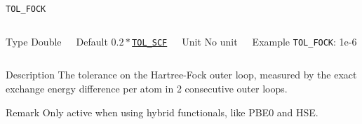 \documentclass[xcolor=dvipsnames,t]{beamer}
\begin{document}
\begin{frame}[allowframebreaks]{\texttt{TOL\_FOCK}} \label{TOL_FOCK}
\vspace*{-12pt}
\begin{columns}
\begin{block}{Type}
Double
\end{block}

\begin{block}{Default}
$0.2*$\hyperlink{TOL_SCF}{\texttt{TOL\_SCF}}
\end{block}

\begin{block}{Unit}
No unit
\end{block}

\begin{block}{Example}
\texttt{TOL\_FOCK}: 1e-6
\end{block}
\end{columns}

\begin{block}{Description}
The tolerance on the Hartree-Fock outer loop, measured by the exact exchange energy difference per atom in 2 consecutive outer loops.
\end{block}

\begin{block}{Remark}
Only active when using hybrid functionals, like PBE0 and HSE. 
\end{block}

\end{frame}
\end{document}
